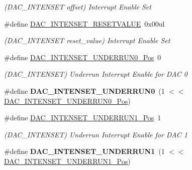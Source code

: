 \begin{DoxyCompactItemize}
\begin{DoxyCompactList}\small\item\em (D\+A\+C\+\_\+\+I\+N\+T\+E\+N\+S\+E\+T offset) Interrupt Enable Set \end{DoxyCompactList}\item 
\hypertarget{group___s_a_m_l21___d_a_c_gac03fead9c4f7f214a3e9c0718a629b84}{}\#define \hyperlink{group___s_a_m_l21___d_a_c_gac03fead9c4f7f214a3e9c0718a629b84}{D\+A\+C\+\_\+\+I\+N\+T\+E\+N\+S\+E\+T\+\_\+\+R\+E\+S\+E\+T\+V\+A\+L\+U\+E}~0x00ul\label{group___s_a_m_l21___d_a_c_gac03fead9c4f7f214a3e9c0718a629b84}

\begin{DoxyCompactList}\small\item\em (D\+A\+C\+\_\+\+I\+N\+T\+E\+N\+S\+E\+T reset\+\_\+value) Interrupt Enable Set \end{DoxyCompactList}\item 
\hypertarget{group___s_a_m_l21___d_a_c_gaf4044c3c930888eb9883abb4c0209232}{}\#define \hyperlink{group___s_a_m_l21___d_a_c_gaf4044c3c930888eb9883abb4c0209232}{D\+A\+C\+\_\+\+I\+N\+T\+E\+N\+S\+E\+T\+\_\+\+U\+N\+D\+E\+R\+R\+U\+N0\+\_\+\+Pos}~0\label{group___s_a_m_l21___d_a_c_gaf4044c3c930888eb9883abb4c0209232}

\begin{DoxyCompactList}\small\item\em (D\+A\+C\+\_\+\+I\+N\+T\+E\+N\+S\+E\+T) Underrun Interrupt Enable for D\+A\+C 0 \end{DoxyCompactList}\item 
\hypertarget{group___s_a_m_l21___d_a_c_ga9a65c7c82e61e62657a29f3fe75e8dab}{}\#define {\bfseries D\+A\+C\+\_\+\+I\+N\+T\+E\+N\+S\+E\+T\+\_\+\+U\+N\+D\+E\+R\+R\+U\+N0}~(1 $<$$<$ \hyperlink{group___s_a_m_l21___d_a_c_gaf4044c3c930888eb9883abb4c0209232}{D\+A\+C\+\_\+\+I\+N\+T\+E\+N\+S\+E\+T\+\_\+\+U\+N\+D\+E\+R\+R\+U\+N0\+\_\+\+Pos})\label{group___s_a_m_l21___d_a_c_ga9a65c7c82e61e62657a29f3fe75e8dab}

\item 
\hypertarget{group___s_a_m_l21___d_a_c_ga57579d33be3bcfb3f7a9b510b91ae165}{}\#define \hyperlink{group___s_a_m_l21___d_a_c_ga57579d33be3bcfb3f7a9b510b91ae165}{D\+A\+C\+\_\+\+I\+N\+T\+E\+N\+S\+E\+T\+\_\+\+U\+N\+D\+E\+R\+R\+U\+N1\+\_\+\+Pos}~1\label{group___s_a_m_l21___d_a_c_ga57579d33be3bcfb3f7a9b510b91ae165}

\begin{DoxyCompactList}\small\item\em (D\+A\+C\+\_\+\+I\+N\+T\+E\+N\+S\+E\+T) Underrun Interrupt Enable for D\+A\+C 1 \end{DoxyCompactList}\item 
\hypertarget{group___s_a_m_l21___d_a_c_gaf7d60356b41c884c967d170894930535}{}\#define {\bfseries D\+A\+C\+\_\+\+I\+N\+T\+E\+N\+S\+E\+T\+\_\+\+U\+N\+D\+E\+R\+R\+U\+N1}~(1 $<$$<$ \hyperlink{group___s_a_m_l21___d_a_c_ga57579d33be3bcfb3f7a9b510b91ae165}{D\+A\+C\+\_\+\+I\+N\+T\+E\+N\+S\+E\+T\+\_\+\+U\+N\+D\+E\+R\+R\+U\+N1\+\_\+\+Pos})\label{group___s_a_m_l21___d_a_c_gaf7d60356b41c884c967d170894930535}


\end{DoxyCompactItemize}
